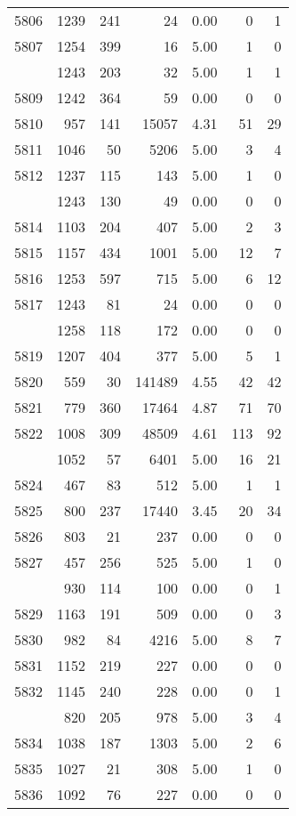 \documentclass[
]{article}
\begin{document}
\begin{table}
\begin{tabular}[t]{lrrrrrr}
5806 & 1239 & 241 & 24 & 0.00 & 0 & 1\\
5807 & 1254 & 399 & 16 & 5.00 & 1 & 0\\
\addlinespace
5808 & 1243 & 203 & 32 & 5.00 & 1 & 1\\
5809 & 1242 & 364 & 59 & 0.00 & 0 & 0\\
5810 & 957 & 141 & 15057 & 4.31 & 51 & 29\\
5811 & 1046 & 50 & 5206 & 5.00 & 3 & 4\\
5812 & 1237 & 115 & 143 & 5.00 & 1 & 0\\
\addlinespace
5813 & 1243 & 130 & 49 & 0.00 & 0 & 0\\
5814 & 1103 & 204 & 407 & 5.00 & 2 & 3\\
5815 & 1157 & 434 & 1001 & 5.00 & 12 & 7\\
5816 & 1253 & 597 & 715 & 5.00 & 6 & 12\\
5817 & 1243 & 81 & 24 & 0.00 & 0 & 0\\
\addlinespace
5818 & 1258 & 118 & 172 & 0.00 & 0 & 0\\
5819 & 1207 & 404 & 377 & 5.00 & 5 & 1\\
5820 & 559 & 30 & 141489 & 4.55 & 42 & 42\\
5821 & 779 & 360 & 17464 & 4.87 & 71 & 70\\
5822 & 1008 & 309 & 48509 & 4.61 & 113 & 92\\
\addlinespace
5823 & 1052 & 57 & 6401 & 5.00 & 16 & 21\\
5824 & 467 & 83 & 512 & 5.00 & 1 & 1\\
5825 & 800 & 237 & 17440 & 3.45 & 20 & 34\\
5826 & 803 & 21 & 237 & 0.00 & 0 & 0\\
5827 & 457 & 256 & 525 & 5.00 & 1 & 0\\
\addlinespace
5828 & 930 & 114 & 100 & 0.00 & 0 & 1\\
5829 & 1163 & 191 & 509 & 0.00 & 0 & 3\\
5830 & 982 & 84 & 4216 & 5.00 & 8 & 7\\
5831 & 1152 & 219 & 227 & 0.00 & 0 & 0\\
5832 & 1145 & 240 & 228 & 0.00 & 0 & 1\\
\addlinespace
5833 & 820 & 205 & 978 & 5.00 & 3 & 4\\
5834 & 1038 & 187 & 1303 & 5.00 & 2 & 6\\
5835 & 1027 & 21 & 308 & 5.00 & 1 & 0\\
5836 & 1092 & 76 & 227 & 0.00 & 0 & 0\\

\end{tabular}
\end{table}
\end{document}
